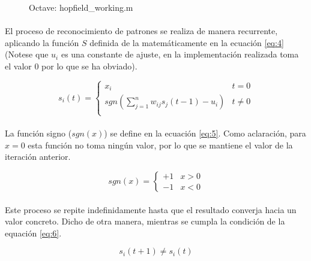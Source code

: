 \documentclass[10pt, a4paper,spanish]{article}
\begin{document}
		\begin{figure}[htpb!]
			\centering
			\inputminted{octave}{../src/hopfield_working.m}
			\caption{Octave: hopfield\_working.m}
			\label{code:working}
		\end{figure}

		\paragraph{}
		El proceso de reconocimiento de patrones se realiza de manera recurrente, aplicando la función $S$ definida de la matemáticamente en la ecuación \ref{eq:4} (Notese que $u_{i}$ es una constante de ajuste, en la implementación realizada toma el valor $0$ por lo que se ha obviado).

		\begin{equation} \label{eq:4}
		 	s_i(t) =
		 	\begin{cases}
      	x_i 																					& t = 0 		\\
      	sgn(\sum_{j=1}^{n} w_{ij}s_{j}(t-1) - u_{i}) 	& t \neq 0 	\\
   		\end{cases}
		\end{equation}

		\paragraph{}
		La función signo ($sgn(x)$) se define en la ecuación \ref{eq:5}. Como aclaración, para $x = 0$ esta función no toma ningún valor, por lo que se mantiene el valor de la iteración anterior.

		\begin{equation} \label{eq:5}
			sgn(x) =
			\begin{cases}
				+1 & x > 0 \\
				-1 & x < 0
			\end{cases}
		\end{equation}

		\paragraph{}
		Este proceso se repite indefinidamente hasta que el resultado converja hacia un valor concreto. Dicho de otra manera, mientras se cumpla la condición de la equación \ref{eq:6}.

		\begin{equation} \label{eq:6}
			s_i(t+1) \neq s_i(t)
		\end{equation}
\end{document}
